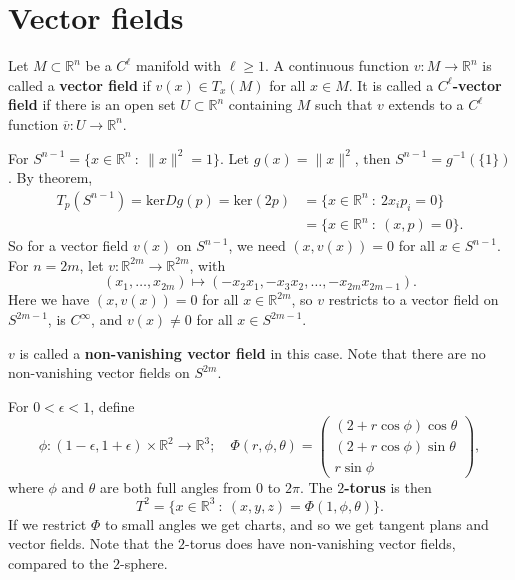 \documentclass[letter-paper]{tufte-book}
\newenvironment{example}[1][Example]{\begin{trivlist}
\item[\hskip \labelsep {\bfseries #1}]}{\end{trivlist}}
\begin{document}
\section{Vector fields}

Let $M \subset \mathbb{R}^n$ be a $C^\ell$ manifold with $\ell \geq 1$. A
continuous function $v : M \to \mathbb{R}^n$ is called a \textbf{vector field}
if $v(x) \in T_x(M)$ for all $x\in M$. It is called a \textbf{$C^\ell$-vector
field} if there is an open set $U \subset \mathbb{R}^n$ containing $M$ such that
$v$ extends to a $C^\ell$ function $\overline{v} : U \to \mathbb{R}^n$.

\begin{example}
  For $S^{n-1} = \{x \in \mathbb{R}^n\ :\ \|x\|^2 = 1\}$. Let $g(x) = \|x\|^2$,
  then $S^{n-1} = g^{-1}(\{1\})$. By theorem,
  \begin{align*}
    T_p(S^{n-1}) = \mbox{ker}Dg(p) = \mbox{ker}(2p) &= \{x \in \mathbb{R}^n\ :\ 2x_i p_i = 0\}\\
      &= \{x \in \mathbb{R}^n\ :\ (x, p) = 0\}.
  \end{align*}
  So for a vector field $v(x)$ on $S^{n-1}$, we need $(x, v(x)) = 0$ for all $x
  \in S^{n-1}$. For $n = 2m$, let $v : \mathbb{R}^{2m} \to \mathbb{R}^{2m}$,
  with
  \begin{equation*}
    (x_1, \ldots, x_{2m}) \mapsto (-x_2 x_1, -x_3 x_2, \ldots, -x_{2m} x_{2m-1}).
  \end{equation*}
  Here we have $(x, v(x)) = 0$ for all $x \in \mathbb{R}^{2m}$, so $v$ restricts
  to a vector field on $S^{2m-1}$, is $C^\infty$, and $v(x) \neq 0$ for all $x
  \in S^{2m-1}$. 
  
  $v$ is called a \textbf{non-vanishing vector field} in this case. Note that
  there are no non-vanishing vector fields on $S^{2m}$.
\end{example}

\begin{example}
  For $0 < \epsilon < 1$, define
  \begin{equation*}
    \phi : (1-\epsilon, 1+\epsilon) \times \mathbb{R}^2 \to \mathbb{R}^3; \quad \Phi(r, \phi, \theta) = \begin{pmatrix}(2+r\cos\phi) \cos\theta \\ (2+r\cos\phi)\sin\theta \\ r\sin\phi \end{pmatrix},
  \end{equation*}
  where $\phi$ and $\theta$ are both full angles from $0$ to $2\pi$. The
  \textbf{$2$-torus} is then
  \begin{equation*}
    T^2 = \{x \in \mathbb{R}^3\ :\ (x,y,z) = \Phi(1, \phi, \theta)\}.
  \end{equation*}
  If we restrict $\Phi$ to small angles we get charts, and so we get tangent
  plans and vector fields. Note that the $2$-torus does have non-vanishing
  vector fields, compared to the $2$-sphere.
\end{example}
\end{document}
